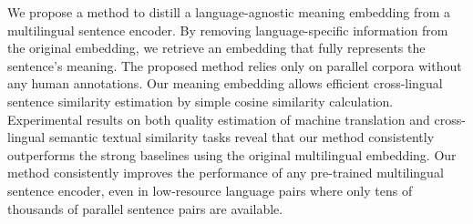 We propose a method to distill a language-agnostic meaning embedding from a multilingual sentence encoder. By removing language-specific information from the original embedding, we retrieve an embedding that fully represents the sentence's meaning. The proposed method relies only on parallel corpora without any human annotations. Our meaning embedding allows efficient cross-lingual sentence similarity estimation by simple cosine similarity calculation. Experimental results on both quality estimation of machine translation and cross-lingual semantic textual similarity tasks reveal that our method consistently outperforms the strong baselines using the original multilingual embedding. Our method consistently improves the performance of any pre-trained multilingual sentence encoder, even in low-resource language pairs where only tens of thousands of parallel sentence pairs are available.
